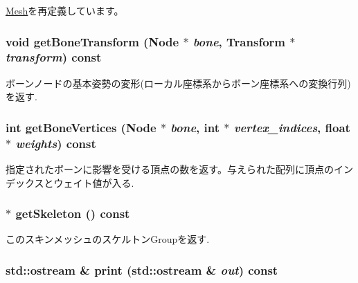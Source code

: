 \hyperlink{classm3g_1_1Mesh_52ce6d0b3eda2bd3a95bfb5b7dbb6f82}{Mesh}を再定義しています。\hypertarget{classm3g_1_1SkinnedMesh_e6c2fed8109053ded845e49f5c3b0c73}{
\subsubsection[{getBoneTransform}]{\setlength{\rightskip}{0pt plus 5cm}void getBoneTransform ({\bf Node} $\ast$ {\em bone}, \/  {\bf Transform} $\ast$ {\em transform}) const}}
\label{classm3g_1_1SkinnedMesh_e6c2fed8109053ded845e49f5c3b0c73}


ボーンノードの基本姿勢の変形(ローカル座標系からボーン座標系への変換行列)を返す. \hypertarget{classm3g_1_1SkinnedMesh_84ec0935b92b7ccc0aed7e66c4eac78f}{
\subsubsection[{getBoneVertices}]{\setlength{\rightskip}{0pt plus 5cm}int getBoneVertices ({\bf Node} $\ast$ {\em bone}, \/  int $\ast$ {\em vertex\_\-indices}, \/  float $\ast$ {\em weights}) const}}
\label{classm3g_1_1SkinnedMesh_84ec0935b92b7ccc0aed7e66c4eac78f}


指定されたボーンに影響を受ける頂点の数を返す。与えられた配列に頂点のインデックスとウェイト値が入る. \hypertarget{classm3g_1_1SkinnedMesh_ce7d69c2b600f6f01a46214db28e6f92}{
\subsubsection[{getSkeleton}]{ $\ast$ getSkeleton () const}}
\label{classm3g_1_1SkinnedMesh_ce7d69c2b600f6f01a46214db28e6f92}


このスキンメッシュのスケルトンGroupを返す. \hypertarget{classm3g_1_1SkinnedMesh_6fea17fa1532df3794f8cb39cb4f911f}{
\subsubsection[{print}]{\setlength{\rightskip}{0pt plus 5cm}std::ostream \& print (std::ostream \& {\em out}) const}}
\label{classm3g_1_1SkinnedMesh_6fea17fa1532df3794f8cb39cb4f911f}


